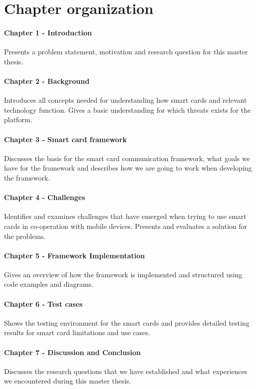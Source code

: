 \section{Chapter organization}
\paragraph{Chapter 1 - Introduction}
Presents a problem statement, motivation and research question for this master thesis.

\paragraph{Chapter 2 - Background}
Introduces all concepts needed for understanding how smart cards and relevant technology function. Gives a basic understanding for which threats exists for the platform.

\paragraph{Chapter 3 - Smart card framework}
Discusses the basis for the smart card communication framework, what goals we have for the framework and describes how we are going to work when developing the framework.

\paragraph{Chapter 4 - Challenges}
Identifies and examines challenges that have emerged when trying to use smart cards in co-operation with mobile devices. Presents and evaluates a solution for the problems.

\paragraph{Chapter 5 - Framework Implementation}
Gives an overview of how the framework is implemented and structured using code examples and diagrams.

\paragraph{Chapter 6 - Test cases}
Shows the testing environment for the smart cards and provides detailed testing results for smart card limitations and use cases.

\paragraph{Chapter 7 - Discussion and Conclusion}
Discusses the research questions that we have established and what experiences we encountered during this master thesis.
